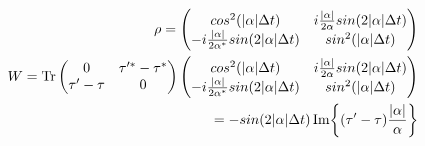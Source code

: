\documentclass{article}
\begin{document}
\begin{align*}
		\rho = \begin{pmatrix}
		cos^2(\abs{\alpha} \Delta t) & i\frac{\abs{\alpha}}{2\alpha} sin(2\abs{\alpha} \Delta t) \\
		-i\frac{\abs{\alpha}}{2\alpha^*} sin(2\abs{\alpha} \Delta t) & sin^2(\abs{\alpha} \Delta t)
		\end{pmatrix} \\
		W = \mathrm{Tr} \begin{pmatrix}
		0 & \tau'^* - \tau^* \\
		\tau' - \tau & 0 \\
		\end{pmatrix}
		\begin{pmatrix}
		cos^2(\abs{\alpha} \Delta t) & i\frac{\abs{\alpha}}{2\alpha} sin(2\abs{\alpha} \Delta t) \\
		-i\frac{\abs{\alpha}}{2\alpha^*} sin(2\abs{\alpha} \Delta t) & sin^2(\abs{\alpha} \Delta t)
		\end{pmatrix} \\
		= -sin(2\abs{\alpha}\Delta t) \Im{(\tau' - \tau)\frac{\abs{\alpha}}{\alpha}}
	\end{align*}
\end{document}
